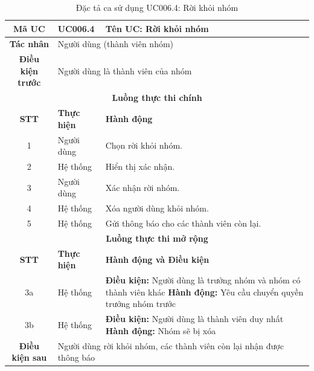 \begin{table}[H]
    \centering
    \label{tab:uc006-4}
    \begin{tabularx}{\textwidth}{|c|p{3.5cm}|X|}
        \hline
        \rowcolor{headergreen} 
        \textbf{Mã UC} & \textbf{UC006.4} & \textbf{Tên UC: Rời khỏi nhóm} \\ \hline
        \textbf{Tác nhân} & \multicolumn{2}{l|}{Người dùng (thành viên nhóm)} \\ \hline
        \textbf{Điều kiện trước} & \multicolumn{2}{X|}{Người dùng là thành viên của nhóm} \\ \hline
        
        \multicolumn{3}{|c|}{\cellcolor{headerorange}\textbf{Luồng thực thi chính}} \\ \hline
        \rowcolor{graybg} \textbf{STT} & \textbf{Thực hiện} & \textbf{Hành động} \\ \hline
        1 & Người dùng & Chọn rời khỏi nhóm. \\ \hline
        2 & Hệ thống & Hiển thị xác nhận. \\ \hline
        3 & Người dùng & Xác nhận rời nhóm. \\ \hline
        4 & Hệ thống & Xóa người dùng khỏi nhóm. \\ \hline
        5 & Hệ thống & Gửi thông báo cho các thành viên còn lại. \\ \hline
        
        \multicolumn{3}{|c|}{\cellcolor{headerorange}\textbf{Luồng thực thi mở rộng}} \\ \hline
        \rowcolor{graybg} \textbf{STT} & \textbf{Thực hiện} & \textbf{Hành động và Điều kiện} \\ \hline
        3a & Hệ thống & \textbf{Điều kiện:} Người dùng là trưởng nhóm và nhóm có thành viên khác \newline \textbf{Hành động:} Yêu cầu chuyển quyền trưởng nhóm trước \\ \hline
        3b & Hệ thống & \textbf{Điều kiện:} Người dùng là thành viên duy nhất \newline \textbf{Hành động:} Nhóm sẽ bị xóa \\ \hline
        
        \textbf{Điều kiện sau} & \multicolumn{2}{X|}{Người dùng rời khỏi nhóm, các thành viên còn lại nhận được thông báo} \\ \hline
    \end{tabularx}
    \caption{Đặc tả ca sử dụng UC006.4: Rời khỏi nhóm}
\end{table}

